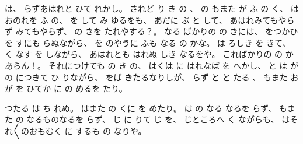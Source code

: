 は、
%
らずあはれと
ひて
れかし。
%
されど
り
き
の
、
%
の
もまた
が
ふ
の
く、
%
はおのれを
ふ
の、
%
を
して
み
ゆるをも、
%
あだに
ぶ
と
して、
%
あはれみてもやらず
みてもやらず、
%
の
きを
たれやする？。
%
なる
ばかりの
の
きには、
%
をつかひ
を
すにも
らぬながら、
%
を
のやうに
ふも
なる
の
かな。
%
は
ろしき
を
きて、
%
く
なす
を
しながら、
%
あはれとも
はれぬ
しき
なるをや。
%
こればかりの
の
かあらん！。
%
それにつけても
の
き
の、
%
はくは
に
はれなば
を
へかし、
%
と
は
が
の
につきて
ひ
りながら、
%
をば
きたるなりしが、
%
らず
と
と
たる
、
%
もまた
お
が
を
ひてか
に
の
めるを
たり。

%
つたる
は
ち
れぬ。
%
はまた
の
くに
を%
めたり。
%
は
の
なる
なるを
らず、
%
もまた
の
なるものなるを
らず、
%
じ
に
りて
じ
を、
%
じところへ
く
ながらも、
%
はそれ〳〵のおもむく
に
するも
の
なりや。


